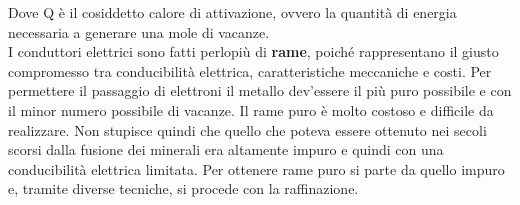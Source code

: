 Dove Q è il cosiddetto calore di attivazione, ovvero la quantità di energia necessaria a generare una mole di vacanze.\\

I conduttori elettrici sono fatti perlopiù di \textbf{rame}, poiché rappresentano il giusto compromesso tra conducibilità elettrica, caratteristiche meccaniche e costi. \newline
Per permettere il passaggio di elettroni il metallo dev'essere il più puro possibile e con il minor numero possibile di vacanze. Il rame puro è molto costoso e difficile da realizzare. Non stupisce quindi che quello che poteva essere ottenuto nei secoli scorsi dalla fusione dei minerali era altamente impuro e quindi con una conducibilità elettrica limitata. \newline
Per ottenere rame puro si parte da quello impuro e, tramite diverse tecniche, si procede con la raffinazione.

